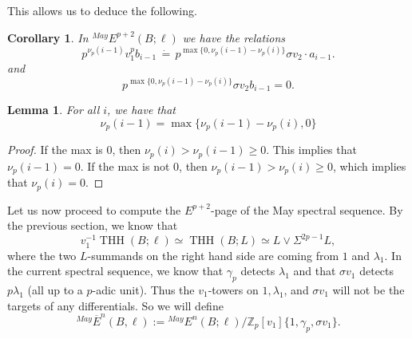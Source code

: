\documentclass[12pt]{amsart}
\newcommand{\Z}{\mathbb{Z}}
\DeclareMathOperator{\THH}{THH}
\newcommand{\MayE}{\mbox{}^{May}E}
\newcommand{\MayoverE}{\mbox{}^{May}\overline{E}}
\newtheorem{cor}[equation]{Corollary}
\newtheorem{lem}[equation]{Lemma}
\theoremstyle{definition}
\numberwithin{equation}{section}
\numberwithin{figure}{section}
\begin{document}
This allows us to deduce the following. 

\begin{cor}
	In $\MayE^{p+2}(B;\ell)$ we have the relations
	\[
	p^{\nu_p(i-1)}v_1^pb_{i-1}\,\dot{=}\, p^{\max\{0, \nu_p(i-1)-\nu_p(i)\}}\sigma v_2\cdot a_{i-1}.
	\]
	and 
	\[
	p^{\max\{0, \nu_p(i-1)-\nu_p(i)\}}\sigma v_2 b_{i-1}=0.
	\]
\end{cor}

\begin{lem}
	For all $i$, we have that 
	\[
	\nu_p(i-1) = \max\{\nu_p(i-1)-\nu_p(i), 0\}
	\]
\end{lem}
\begin{proof}
	If the max is 0, then $\nu_p(i)>\nu_{p}(i-1)\geq 0$. This implies that $\nu_p(i-1)=0$. If the max is not 0, then $\nu_p(i-1)>\nu_p(i)\geq 0$, which implies that $\nu_p(i)=0$. 
\end{proof}

Let us now proceed to compute the $E^{p+2}$-page of the May spectral sequence. By the previous section, we know that 
\[
v_1^{-1}\THH(B;\ell)\simeq \THH(B;L)\simeq L\vee \Sigma^{2p-1}L,
\]
where the two $L$-summands on the right hand side are coming from $1$ and $\lambda_1$. In the current spectral sequence, we know that $\gamma_p$ detects $\lambda_1$ and that $\sigma v_1$ detects $p\lambda_1$ (all up to a $p$-adic unit). Thus the $v_1$-towers on $1, \lambda_1$, and $\sigma v_1$ will not be the targets of any differentials. So we will define 
\[
\MayoverE^n(B,\ell):= \MayE^n(B;\ell)/\Z_p[v_1]\{1, \gamma_p, \sigma v_1\}.
\]
\end{document}
